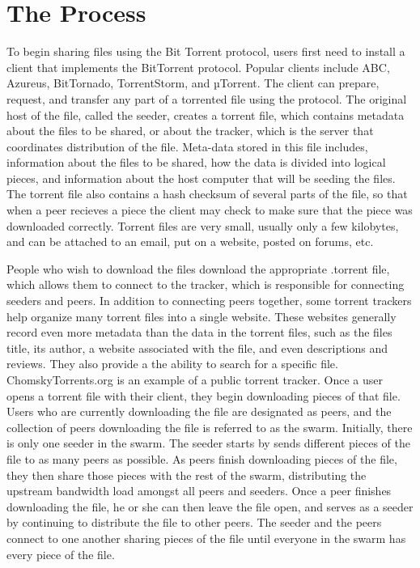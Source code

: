 \documentclass[a4paper,12pt]{report}
\begin{document}
\section{The Process}
To begin sharing files using the Bit Torrent protocol, users first need to install a client that implements the BitTorrent protocol.
Popular clients include ABC, Azureus, BitTornado, TorrentStorm, and µTorrent. The client can prepare, request, and transfer any part of a torrented file using the protocol.
The original host of the file, called the seeder, creates a torrent file, which contains metadata about the files to be shared, or about the tracker, which is the server that coordinates distribution of the file.
Meta-data stored in this file includes, information about the files to be shared, how the data is divided into logical pieces, and information about the host computer that will be seeding the files. The torrent file also contains a hash checksum of several parts of the file, so that when a peer recieves a piece the client may check to make sure that the piece was downloaded correctly.
Torrent files are very small, usually only a few kilobytes, and can be attached to an email, put on a website, posted on forums, etc.


People who wish to download the files download the appropriate .torrent file, which allows them to connect to the tracker, which is responsible for connecting seeders and peers.
In addition to connecting peers together, some torrent trackers help organize many torrent files into a single website. These websites generally record even more metadata than the data in the torrent files, such as the files title, its author, a website associated with the file, and even descriptions and reviews.
They also provide a the ability to search for a specific file. ChomskyTorrents.org is an example of a public torrent tracker.
Once a user opens a torrent file with their client, they begin downloading pieces of that file.
Users who are currently downloading the file are designated as peers, and the collection of peers downloading the file is referred to as the swarm.
Initially, there is only one seeder in the swarm.
The seeder starts by sends different pieces of the file to as many peers as possible. 
As peers finish downloading pieces of the file, they then share those pieces with the rest of the swarm, distributing the upstream bandwidth load amongst all peers and seeders. 
Once a peer finishes downloading the file, he or she can then leave the file open, and serves as a seeder by continuing to distribute the file to other peers.
The seeder and the peers connect to one another sharing pieces of the file until everyone in the swarm has every piece of the file.
\end{document}

